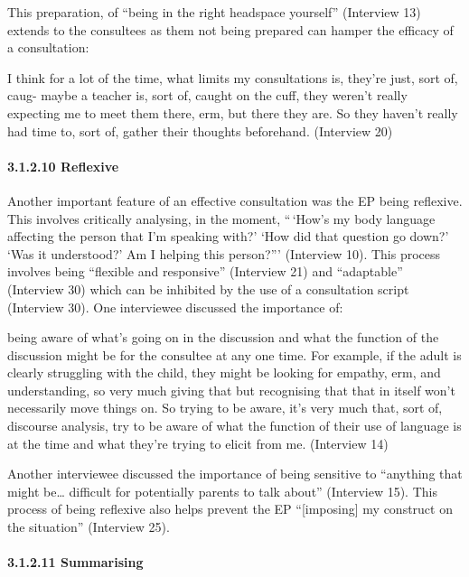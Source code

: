 \documentclass[
]{article}
\begin{document}
This preparation, of ``being in the right headspace yourself''
(Interview 13) extends to the consultees as them not being prepared can
hamper the efficacy of a consultation:

I think for a lot of the time, what limits my consultations is, they're
just, sort of, caug- maybe a teacher is, sort of, caught on the cuff,
they weren't really expecting me to meet them there, erm, but there they
are. So they haven't really had time to, sort of, gather their thoughts
beforehand. (Interview 20)

\hypertarget{reflexive}{%
\paragraph{3.1.2.10 Reflexive}\label{reflexive}}

Another important feature of an effective consultation was the EP being
reflexive. This involves critically analysing, in the moment, ``\,`How's
my body language affecting the person that I'm speaking with?' `How did
that question go down?' `Was it understood?' Am I helping this
person?''' (Interview 10). This process involves being ``flexible and
responsive'' (Interview 21) and ``adaptable'' (Interview 30) which can
be inhibited by the use of a consultation script (Interview 30). One
interviewee discussed the importance of:

being aware of what's going on in the discussion and what the function
of the discussion might be for the consultee at any one time. For
example, if the adult is clearly struggling with the child, they might
be looking for empathy, erm, and understanding, so very much giving that
but recognising that that in itself won't necessarily move things on. So
trying to be aware, it's very much that, sort of, discourse analysis,
try to be aware of what the function of their use of language is at the
time and what they're trying to elicit from me. (Interview 14)

Another interviewee discussed the importance of being sensitive to
``anything that might be\ldots{} difficult for potentially parents to
talk about'' (Interview 15). This process of being reflexive also helps
prevent the EP ``{[}imposing{]} my construct on the situation''
(Interview 25).

\hypertarget{summarising}{%
\paragraph{3.1.2.11 Summarising}\label{summarising}}
\end{document}
